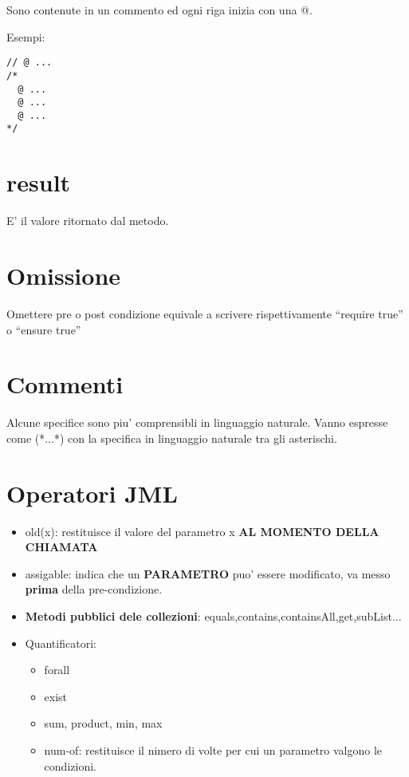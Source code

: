 \documentclass[\main/main.tex]{subfiles}
\begin{document}
Sono contenute in un commento ed ogni riga inizia con una @.

Esempi:
\begin{verbatim}
// @ ...
/*
  @ ...
  @ ...
  @ ...
*/
\end{verbatim}



\section{\bs result}
E' il valore ritornato dal metodo.




\section{Omissione}
Omettere pre o post condizione equivale a scrivere rispettivamente ``require true'' o ``ensure true''


\section{Commenti}
Alcune specifice sono piu' comprensibli in linguaggio naturale.
Vanno espresse come (*...*) con la specifica in linguaggio naturale tra gli asterischi.



\section{Operatori JML}
\begin{itemize}
  \item \bs old(x): restituisce il valore del parametro x \textbf{AL MOMENTO DELLA CHIAMATA}
  \item assigable: indica che un \textbf{PARAMETRO} puo' essere modificato, va messo \textbf{prima} della pre-condizione.
  \item \textbf{Metodi pubblici dele collezioni}: equals,contains,containsAll,get,subList...
  \item Quantificatori:
  \begin{itemize}
    \item \bs forall
    \item \bs exist
    \item \bs sum, \bs product, \bs min, \bs max
    \item \bs num-of: restituisce il nimero di volte per cui un parametro valgono le condizioni.
  \end{itemize}
\end{itemize}
\end{document}
